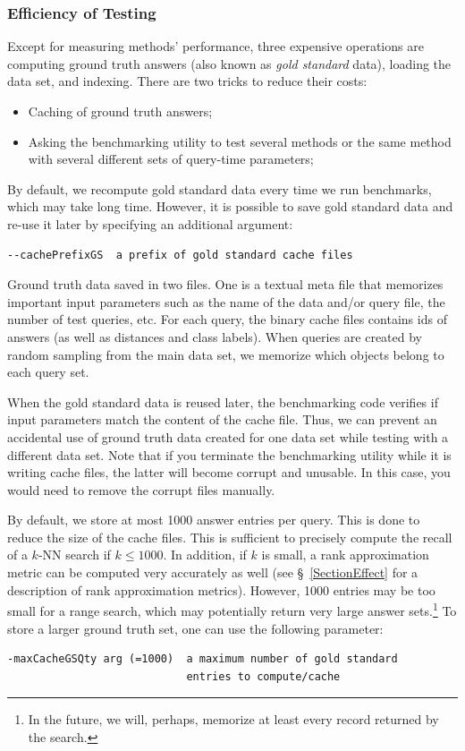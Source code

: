 \documentclass[runningheads,a4paper]{llncs}
\newcommand{\knn}{$k$-NN }
\begin{document}
{\subsubsection{Efficiency of Testing}\label{SectionBenchEfficiency}
Except for  measuring methods' performance, 
three expensive operations are computing ground truth answers (also
known as \emph{gold standard} data),
loading the data set, and indexing. There are two tricks to reduce their costs:
\begin{itemize}
\item Caching of ground truth answers;
\item Asking the benchmarking utility to test several methods
or the same method with several different sets of query-time parameters; 
\end{itemize}

By default, we recompute gold standard data every time we run benchmarks, which may take long time.
However, it is possible to save gold standard data and re-use it later
by specifying an additional argument:
\begin{verbatim}
--cachePrefixGS  a prefix of gold standard cache files
\end{verbatim}
Ground truth data saved in two files. One is a textual meta file
that memorizes important input parameters such as the name of the data and/or query file,
the number of test queries, etc. 
For each query, the binary cache files contains ids of answers (as well as distances and 
class labels). 
When queries are created by random sampling from the main data set,
we memorize which objects belong to each query set.

When the gold standard data is reused later,
the benchmarking code verifies if input parameters match the content of the cache file. 
Thus, we can prevent an accidental use of ground truth data created for one data set
while testing with a different data set.
Note that if you terminate the benchmarking utility while it is writing cache files,
the latter will become corrupt and unusable. In this case, you would need to remove 
the corrupt files manually.

By default, we store at most 1000 answer entries per query. 
This is done to reduce the size of the cache files.
This is sufficient to precisely compute the recall of a \knn search if $k \le 1000$.
In addition, if $k$ is small, a rank approximation metric can be computed very accurately as well (see \S~\ref{SectionEffect}
for a description of rank approximation metrics).
However, 1000 entries may be too small for a range search, which may potentially return very large answer sets.\footnote{In the future, we will, perhaps, memorize at least every record returned by the search.} 
To store a larger ground truth set,
one can use the following parameter:
\begin{verbatim}
-maxCacheGSQty arg (=1000)  a maximum number of gold standard 
                            entries to compute/cache
\end{verbatim}

}
\end{document}
